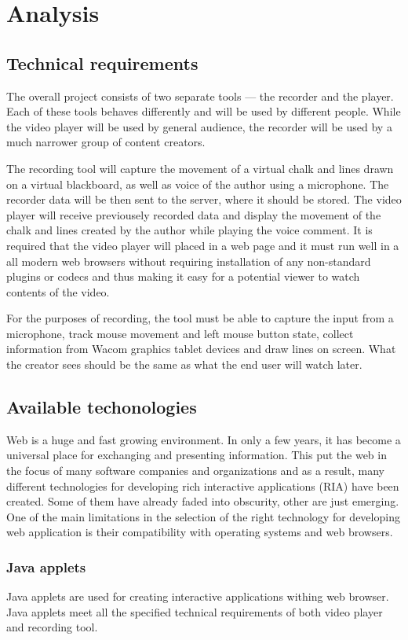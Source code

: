 \chapter{Analysis}

\section{Technical requirements}
The overall project consists of two separate tools --- the recorder and the player. Each of these tools behaves differently and will be used by different people. While the video player will be used by general audience, the recorder will be used by a much narrower group of content creators.

The recording tool will capture the movement of a virtual chalk and lines drawn on a virtual blackboard, as well as voice of the author using a microphone. The recorder data will be then sent to the server, where it should be stored. The video player will receive previousely recorded data and display the movement of the chalk and lines created by the author while playing the voice comment. It is required that the video player will placed in a web page and it must run well in a all modern web browsers without requiring installation of any non-standard plugins or codecs and thus making it easy for a potential viewer to watch contents of the video.

For the purposes of recording, the tool must be able to capture the input from a microphone, track mouse movement and left mouse button state, collect information from Wacom graphics tablet devices and draw lines on screen. What the creator sees should be the same as what the end user will watch later.

\section{Available techonologies}
Web is a huge and fast growing environment. In only a few years, it has become a universal place for exchanging and presenting information. This put the web in the focus of many software companies and organizations and as a result, many different technologies for developing rich interactive applications (RIA) have been created. Some of them have already faded into obscurity, other are just emerging. One of the main limitations in the selection of the right technology for developing web application is their compatibility with operating systems and web browsers.

\subsection{Java applets}
Java applets are used for creating interactive applications withing web browser. Java applets meet all the specified technical requirements of both video player and recording tool.

